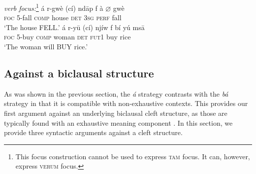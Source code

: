 \documentclass[output=paper,
modfonts
]{langscibook}
\begin{document}
\ea \textit{verb focus:}\footnote{This focus construction cannot be used to express \textsc{tam} focus. It can, however, express \textsc{verum} focus.}
\settowidth{}
\ea \label{s10}
\gll \'a {r-gw\`e} (c\'i) nd\=ap f \`a $\varnothing$ {gw\`e}\\  
     \textsc{foc} {\textsc{5}-fall} \textsc{comp} house \textsc{det}  \textsc{3sg} \textsc{perf} {fall}\\ 
\glt `The house FELL.'
\ex \label{s11}
\gll \'a {r-y\=u} (c\'i) nj\'iw f b\'i {y\'u} ms\=a\\  
     \textsc{foc} {\textsc{5}-buy} \textsc{comp} woman \textsc{det} \textsc{fut1} {buy} rice\\ 
\glt `The woman will BUY rice.'
\z \z


\subsection{Against a biclausal structure}
As was shown in the previous section, the \textit{\'a} strategy contrasts with the \textit{b\'a} strategy in that it is compatible with non-exhaustive contexts. This provides our first argument against an underlying biclausal cleft structure, as those are typically found with an exhaustive meaning component \citep{Horn1981,Percus1997}. In this section, we provide three syntactic arguments against a cleft structure. 
\end{document}
